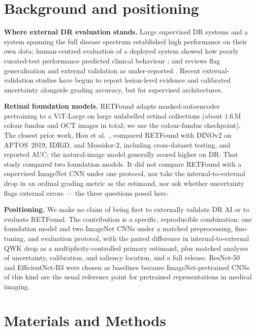 \documentclass[journal]{IEEEtran}
\renewcommand{\_}{\origunderscore\allowbreak}
\begin{document}
\section{Background and positioning}
\label{sec:related}

\textbf{Where external DR evaluation stands.} Large supervised DR systems
\cite{gulshan2016,ting2017} and a system spanning the full disease spectrum
\cite{dai2021spectrum} established high performance on their own data;
human-centred evaluation of a deployed system showed how poorly curated-test
performance predicted clinical behaviour \cite{beede2020}; and reviews flag
generalisation and external validation as under-reported
\cite{grzybowski2020review}. Recent external-validation studies have begun to
report lesion-level evidence \cite{jafarpoor2026multitask} and calibrated
uncertainty \cite{saleem2026cgdrnet} alongside grading accuracy, but for
supervised architectures.

\textbf{Retinal foundation models.} RETFound \cite{zhou2023retfound} adapts
masked-autoencoder pretraining \cite{he2022mae} to a ViT-Large
\cite{dosovitskiy2021vit} on large unlabelled retinal collections (about
$1.6$\,M colour fundus and OCT images in total; we use the colour-fundus
checkpoint). The closest prior work, Hou et al.\ \cite{hou2025dinov2}, compared
RETFound with DINOv2 on APTOS~2019, IDRiD, and Messidor-2, including
cross-dataset testing, and reported AUC; the natural-image model generally scored
higher on DR. That study compared two foundation models. It did not compare
RETFound with a supervised ImageNet CNN under one protocol, nor take the
internal-to-external drop in an ordinal grading metric as the estimand, nor ask
whether uncertainty flags external errors --- the three questions posed here.

\textbf{Positioning.} We make no claim of being first to externally validate DR
AI or to evaluate RETFound. The contribution is a specific, reproducible
combination: one foundation model and two ImageNet CNNs under a matched
preprocessing, fine-tuning, and evaluation protocol, with the paired difference
in internal-to-external QWK drop as a multiplicity-controlled primary estimand,
plus matched analyses of uncertainty, calibration, and saliency location, and a
full release. ResNet-50 \cite{he2016resnet} and EfficientNet-B3
\cite{tan2019efficientnet} were chosen as baselines because ImageNet-pretrained
CNNs of this kind are the usual reference point for pretrained representations in
medical imaging.


\section{Materials and Methods}
\label{sec:methods}
\end{document}
